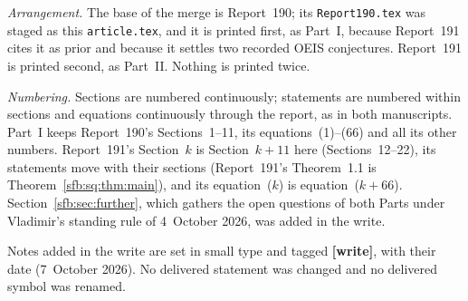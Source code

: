\documentclass[11pt]{article}
\theoremstyle{remark}\newtheorem{remark}[theorem]{Remark}
\newcommand{\file}[1]{\nolinkurl{#1}}
\begin{document}
\emph{Arrangement.} The base of the merge is Report~190; its
\file{Report190.tex} was staged as this \file{article.tex}, and it is printed
first, as Part~I, because Report~191 cites it as prior and because it settles
two recorded OEIS conjectures. Report~191 is printed second, as Part~II.
Nothing is printed twice.

\emph{Numbering.} Sections are numbered continuously; statements are
numbered within sections and equations continuously through the report, as
in both manuscripts. Part~I keeps Report~190's Sections~1--11, its
equations~(1)--(66) and all its other numbers. Report~191's Section~$k$
is Section~$k+11$ here (Sections~12--22), its statements move with their
sections (Report~191's Theorem~1.1 is Theorem~\ref{sfb:sq:thm:main}), and its
equation~($k$) is equation~($k+66$). Section~\ref{sfb:sec:further}, which
gathers the open questions of both Parts under Vladimir's standing rule of
4~October 2026, was added in the write.

Notes added in the write are set in small type and tagged \textbf{[write]},
with their date (7~October 2026). No delivered statement was changed and no
delivered symbol was renamed.
\end{document}
